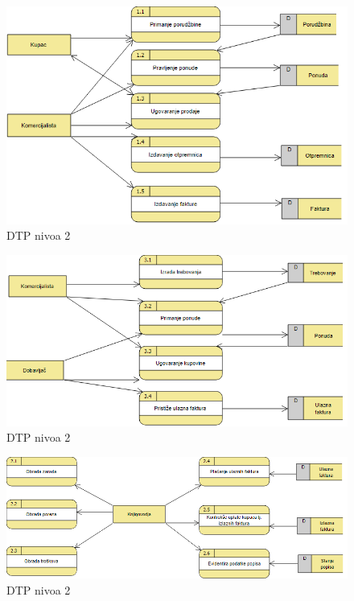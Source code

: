 \begin{figure}[ht]
\centering
\includegraphics[width=170mm]{slike/dtp-lvl2prodaja.png}%
\caption{DTP nivoa 2}
\end{figure}

\begin{figure}[ht]
\centering
\includegraphics[width=170mm]{slike/dtp-lvl2nabavka.png}%
\caption{DTP nivoa 2}
\end{figure}

\begin{figure}[ht]
\centering
\includegraphics[width=170mm]{slike/dtp-lvl2knjig.png}%
\caption{DTP nivoa 2}
\end{figure}

\clearpage